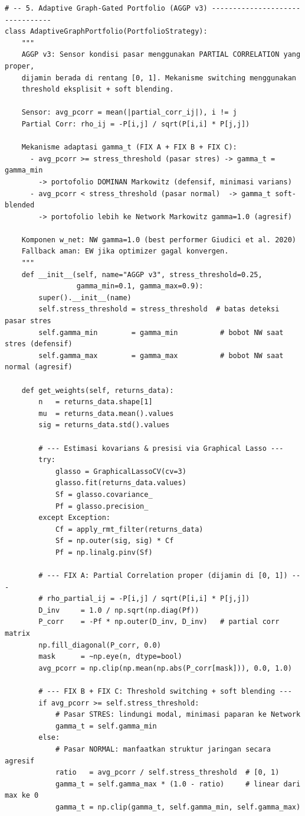 \documentclass[12pt,a4paper]{article}
\begin{document}
\begin{lstlisting}[caption={Kelas-kelas strategi portofolio (AGGP v3 -- Fix A/B/C Applied)}]
# -- 5. Adaptive Graph-Gated Portfolio (AGGP v3) --------------------------------
class AdaptiveGraphPortfolio(PortfolioStrategy):
    """
    AGGP v3: Sensor kondisi pasar menggunakan PARTIAL CORRELATION yang proper,
    dijamin berada di rentang [0, 1]. Mekanisme switching menggunakan
    threshold eksplisit + soft blending.

    Sensor: avg_pcorr = mean(|partial_corr_ij|), i != j
    Partial Corr: rho_ij = -P[i,j] / sqrt(P[i,i] * P[j,j])

    Mekanisme adaptasi gamma_t (FIX A + FIX B + FIX C):
      - avg_pcorr >= stress_threshold (pasar stres) -> gamma_t = gamma_min
        -> portofolio DOMINAN Markowitz (defensif, minimasi varians)
      - avg_pcorr < stress_threshold (pasar normal)  -> gamma_t soft-blended
        -> portofolio lebih ke Network Markowitz gamma=1.0 (agresif)

    Komponen w_net: NW gamma=1.0 (best performer Giudici et al. 2020)
    Fallback aman: EW jika optimizer gagal konvergen.
    """
    def __init__(self, name="AGGP v3", stress_threshold=0.25,
                 gamma_min=0.1, gamma_max=0.9):
        super().__init__(name)
        self.stress_threshold = stress_threshold  # batas deteksi pasar stres
        self.gamma_min        = gamma_min          # bobot NW saat stres (defensif)
        self.gamma_max        = gamma_max          # bobot NW saat normal (agresif)

    def get_weights(self, returns_data):
        n   = returns_data.shape[1]
        mu  = returns_data.mean().values
        sig = returns_data.std().values

        # --- Estimasi kovarians & presisi via Graphical Lasso ---
        try:
            glasso = GraphicalLassoCV(cv=3)
            glasso.fit(returns_data.values)
            Sf = glasso.covariance_
            Pf = glasso.precision_
        except Exception:
            Cf = apply_rmt_filter(returns_data)
            Sf = np.outer(sig, sig) * Cf
            Pf = np.linalg.pinv(Sf)

        # --- FIX A: Partial Correlation proper (dijamin di [0, 1]) ---
        # rho_partial_ij = -P[i,j] / sqrt(P[i,i] * P[j,j])
        D_inv     = 1.0 / np.sqrt(np.diag(Pf))
        P_corr    = -Pf * np.outer(D_inv, D_inv)   # partial corr matrix
        np.fill_diagonal(P_corr, 0.0)
        mask      = ~np.eye(n, dtype=bool)
        avg_pcorr = np.clip(np.mean(np.abs(P_corr[mask])), 0.0, 1.0)

        # --- FIX B + FIX C: Threshold switching + soft blending ---
        if avg_pcorr >= self.stress_threshold:
            # Pasar STRES: lindungi modal, minimasi paparan ke Network
            gamma_t = self.gamma_min
        else:
            # Pasar NORMAL: manfaatkan struktur jaringan secara agresif
            ratio   = avg_pcorr / self.stress_threshold  # [0, 1)
            gamma_t = self.gamma_max * (1.0 - ratio)     # linear dari max ke 0
            gamma_t = np.clip(gamma_t, self.gamma_min, self.gamma_max)


\end{lstlisting}
\end{document}
